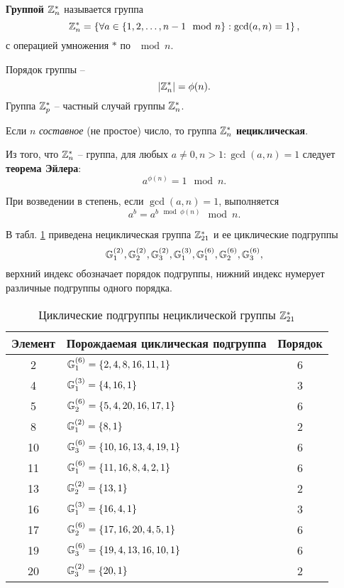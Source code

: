 \textbf{Группой $\mathbb{Z}_n^*$} называется группа
    \[ \mathbb{Z}_n^* = \left\{ \forall a \in \left\{ 1, 2,  \dots,  n-1 \mod n \right\} : \gcd(a,n) = 1 \right\}, \]
с операцией умножения $\ast$ по $\mod n$.

Порядок группы --
    \[ |\mathbb{Z}_n^*| = \phi(n). \]
Группа $\mathbb{Z}_p^*$ -- частный случай группы $\mathbb{Z}_n^*$.

Если $n$ \emph{составное} (не простое) число, то группа $\mathbb{Z}_n^*$ \textbf{нециклическая}.

Из того, что $\mathbb{Z}_n^*$ -- группа, для любых $a \neq 0, n > 1: \gcd(a,n) = 1$ следует \textbf{теорема Эйлера}:
    \[ a^{\phi(n)} = 1 \mod n. \]

При возведении в степень, если $\gcd(a,n) = 1$, выполняется
    \[ a^b = a^{b \mod \phi(n)} \mod n. \]

\example
В табл. \ref{tab:Zn-sample} приведена нециклическая группа $\mathbb{Z}_{21}^*$ и ее циклические подгруппы
    \[ \mathbb{G}_1^{(2)}, \mathbb{G}_2^{(2)}, \mathbb{G}_3^{(2)}, \mathbb{G}_1^{(3)}, \mathbb{G}_1^{(6)}, \mathbb{G}_2^{(6)}, \mathbb{G}_3^{(6)}, \]
верхний индекс обозначает порядок подгруппы, нижний индекс нумерует различные подгруппы одного порядка.

\begin{table}[h!]
    \centering
    \caption{Циклические подгруппы нециклической группы $\mathbb{Z}_{21}^*$\label{tab:Zn-sample}}
    \begin{tabular}{|c|l|c|}
        \hline
        Элемент & Порождаемая циклическая подгруппа & Порядок \\
        \hline
        2  & $\mathbb{G}_1^{(6)} = \{ 2, 4, 8, 16, 11, 1 \}$ & 6 \\
        4  & $\mathbb{G}_1^{(3)} = \{ 4, 16, 1 \}$ & 3 \\
        5  & $\mathbb{G}_2^{(6)} = \{ 5, 4, 20, 16, 17, 1 \}$ & 6 \\
        8  & $\mathbb{G}_1^{(2)} = \{ 8, 1 \}$ & 2 \\
        10 & $\mathbb{G}_3^{(6)} = \{ 10, 16, 13, 4, 19, 1 \}$ & 6 \\
        11 & $\mathbb{G}_1^{(6)} = \{ 11, 16, 8, 4, 2, 1 \}$ & 6 \\
        13 & $\mathbb{G}_2^{(2)} = \{ 13, 1 \}$ & 2 \\
        16 & $\mathbb{G}_1^{(3)} = \{ 16, 4, 1 \}$ & 3 \\
        17 & $\mathbb{G}_2^{(6)} = \{ 17, 16, 20, 4, 5, 1 \}$ & 6 \\
        19 & $\mathbb{G}_3^{(6)} = \{ 19, 4, 13, 16, 10, 1 \}$ & 6 \\
        20 & $\mathbb{G}_3^{(2)} = \{ 20, 1 \}$ & 2 \\
        \hline
    \end{tabular}
\end{table}
\exampleend
